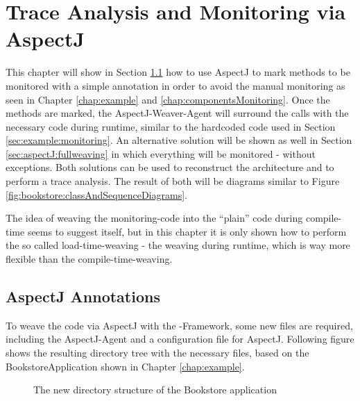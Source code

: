 % 

\chapter{Trace Analysis and Monitoring via AspectJ}\label{chap:aspectJ}

This chapter will show in Section \ref{sec:aspectJ:annotation} how
to use AspectJ to mark methods to be monitored with a simple annotation
in order to avoid the manual monitoring as seen in Chapter \ref{chap:example}
and \ref{chap:componentsMonitoring}. Once the methods are marked, the AspectJ-Weaver-Agent
will surround the calls with the necessary code during runtime, similar
to the hardcoded code used in Section \ref{sec:example:monitoring}.
An alternative solution will be shown as well in Section \ref{sec:aspectJ:fullweaving}
in which everything will be monitored - without exceptions. Both solutions
can be used to reconstruct the architecture and to perform a trace
analysis. The result of both will be diagrams similar to Figure \ref{fig:bookstore:classAndSequenceDiagrams}.

The idea of weaving the monitoring-code into the ``plain'' code
during compile-time seems to suggest itself, but in this chapter it
is only shown how to perform the so called load-time-weaving - the
weaving during runtime, which is way more flexible than the compile-time-weaving.

\section{AspectJ Annotations}\label{sec:aspectJ:annotation}

To weave the code via AspectJ with the \Kieker{}-Framework,
some new files are required, including the AspectJ-Agent and a configuration
file for AspectJ. Following figure shows the resulting directory tree
with the necessary files, based on the BookstoreApplication shown
in Chapter \ref{chap:example}.

\begin{figure}[H]
\begin{graybox}
\end{graybox}

\caption{The new directory structure of the Bookstore application}
\end{figure}

